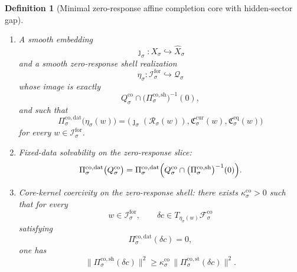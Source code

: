 \documentclass[11pt]{article}
\newcommand{\ForSpace}[1]{\mathcal I_{#1}^{\mathrm{for}}}
\newcommand{\Reduction}[1]{\mathcal R_{#1}}
\newcommand{\CurrentCarrier}[1]{\mathfrak C_{#1}^{\mathrm{cur}}}
\newcommand{\EqCarrier}[1]{\mathfrak C_{#1}^{\mathrm{eq}}}
\newcommand{\VisibleAffine}[1]{\widehat X_{#1}}
\newcommand{\DataSpace}[1]{\mathcal Y_{#1}^{\mathrm{obs}}}
\newcommand{\AmbientTarget}[1]{E_{#1}^{\mathrm{amb}}}
\newcommand{\CoreState}[1]{\mathcal C_{#1}}
\newcommand{\CoreSpace}[1]{\mathcal Q_{#1}}
\newcommand{\CoreAffine}[1]{\mathcal F_{#1}^{\mathrm{co}}}
\newcommand{\CoreBody}[1]{Q_{#1}^{\mathrm{co}}}
\newcommand{\CoreStateProj}[1]{\Pi_{#1}^{\mathrm{co,st}}}
\newcommand{\CoreDataProj}[1]{\Pi_{#1}^{\mathrm{co,dat}}}
\newcommand{\CoreShellProj}[1]{\Pi_{#1}^{\mathrm{co,sh}}}
\newcommand{\CoreTime}[1]{\tau_{#1}^{\mathrm{co}}}
\newcommand{\CoreEmbed}[1]{\eta_{#1}}
\newcommand{\GapSpace}[1]{H_{#1}}
\newcommand{\GapBody}[1]{D_{#1}}
\newcommand{\HiddenOperator}[1]{K_{#1}^{\mathrm{hid}}}
\newtheorem{definition}{Definition}
\begin{document}
\begin{definition}[Minimal zero-response affine completion core with hidden-sector gap]
\begin{enumerate}
\[    O(\CoreState{\sigma})\times
    O(\DataSpace{\sigma})\times
    O(\AmbientTarget{\sigma})\times
    O(\GapSpace{\sigma})
    \]
    and an orthogonal involution
    \[
    \CoreTime{\sigma}\in
    O(\CoreState{\sigma})\times
    O(\DataSpace{\sigma})\times
    O(\AmbientTarget{\sigma})\times
    O(\GapSpace{\sigma})
    \]
    preserving \(\CoreAffine{\sigma}\), \(\CoreBody{\sigma}\), the zero-response slice
    \[
    \CoreState{\sigma}\oplus\DataSpace{\sigma}\oplus\{0\},
    \]
    the hidden body \(\GapBody{\sigma}\), and \(\HiddenOperator{\sigma}\).
    \item A smooth embedding
    \[
    \jmath_{\sigma}:X_{\sigma}\hookrightarrow \VisibleAffine{\sigma}
    \]
    and a smooth zero-response shell realization
    \[
    \CoreEmbed{\sigma}:\ForSpace{\sigma}\hookrightarrow \CoreSpace{\sigma}
    \]
    whose image is exactly
    \[
    \CoreBody{\sigma}\cap
    \bigl(\CoreShellProj{\sigma}\bigr)^{-1}(0),
    \]
    and such that
    \begin{equation}
    \CoreDataProj{\sigma}\bigl(\CoreEmbed{\sigma}(w)\bigr)
    =
    \bigl(
    \jmath_{\sigma}(\Reduction{\sigma}(w)),
    \CurrentCarrier{\sigma}(w),
    \EqCarrier{\sigma}(w)
    \bigr)
    \label{eq:corecompat}
    \end{equation}
    for every \(w\in\ForSpace{\sigma}\).
    \item Fixed-data solvability on the zero-response slice:
    \begin{equation}
    \CoreDataProj{\sigma}\bigl(\CoreBody{\sigma}\bigr)
    =
    \CoreDataProj{\sigma}
    \Bigl(
    \CoreBody{\sigma}\cap
    \bigl(\CoreShellProj{\sigma}\bigr)^{-1}(0)
    \Bigr).
    \label{eq:coresolvability}
    \end{equation}
    \item Core-kernel coercivity on the zero-response shell: there exists \(\kappa_{\sigma}^{\mathrm{co}}>0\) such that for every
    \[
    w\in\ForSpace{\sigma},
    \qquad
    \delta c\in T_{\CoreEmbed{\sigma}(w)}\CoreAffine{\sigma}
    \]
    satisfying
    \[
    \CoreDataProj{\sigma}(\delta c)=0,
    \]
    one has
    \begin{equation}
    \bigl\|
    \CoreShellProj{\sigma}(\delta c)
    \bigr\|^{2}
    \ge
    \kappa_{\sigma}^{\mathrm{co}}\,
    \bigl\|
    \CoreStateProj{\sigma}(\delta c)
    \bigr\|^{2}.
    \label{eq:corecoercive}
    \end{equation}
\end{enumerate}
\end{definition}
\end{document}
